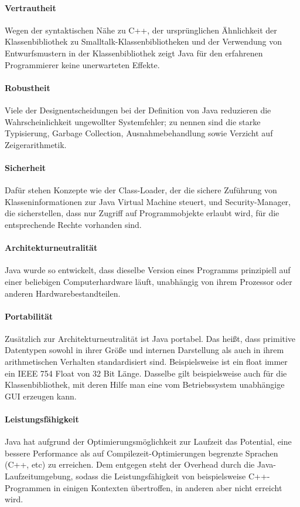 \paragraph{Vertrautheit}
Wegen der syntaktischen Nähe zu C++, der ursprünglichen Ähnlichkeit der Klassenbibliothek zu Smalltalk-Klassenbibliotheken und der Verwendung von Entwurfsmustern in der Klassenbibliothek zeigt Java für den erfahrenen Programmierer keine unerwarteten Effekte.

\paragraph{Robustheit}
Viele der Designentscheidungen bei der Definition von Java reduzieren die Wahrscheinlichkeit ungewollter Systemfehler; zu nennen sind die starke Typisierung, Garbage Collection, Ausnahmebehandlung sowie Verzicht auf Zeigerarithmetik.


\paragraph{Sicherheit}
Dafür stehen Konzepte wie der Class-Loader, der die sichere Zuführung von Klasseninformationen zur Java Virtual Machine steuert, und Security-Manager, die sicherstellen, dass nur Zugriff auf Programmobjekte erlaubt wird, für die entsprechende Rechte vorhanden sind.

\paragraph{Architekturneutralität}
Java wurde so entwickelt, dass dieselbe Version eines Programms prinzipiell auf einer beliebigen Computerhardware läuft, unabhängig von ihrem Prozessor oder anderen Hardwarebestandteilen.

\paragraph{Portabilität}
Zusätzlich zur Architekturneutralität ist Java portabel. Das heißt, dass primitive Datentypen sowohl in ihrer Größe und internen Darstellung als auch in ihrem arithmetischen Verhalten standardisiert sind. Beispielsweise ist ein float immer ein IEEE 754 Float von 32 Bit Länge. Dasselbe gilt beispielsweise auch für die Klassenbibliothek, mit deren Hilfe man eine vom Betriebssystem unabhängige GUI erzeugen kann.

\paragraph{Leistungsfähigkeit}
Java hat aufgrund der Optimierungsmöglichkeit zur Laufzeit das Potential, eine bessere Performance als auf Compilezeit-Optimierungen begrenzte Sprachen (C++, etc) zu erreichen. Dem entgegen steht der Overhead durch die Java-Laufzeitumgebung, sodass die Leistungsfähigkeit von beispielsweise C++-Programmen in einigen Kontexten übertroffen, in anderen aber nicht erreicht wird.

